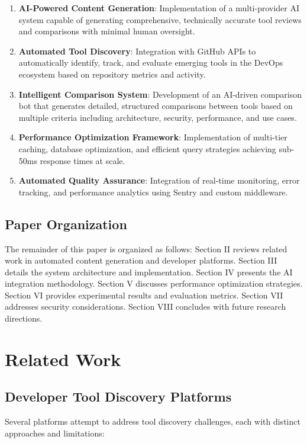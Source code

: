 \documentclass[conference]{IEEEtran}
\begin{document}
\begin{enumerate}
    \item \textbf{AI-Powered Content Generation}: Implementation of a multi-provider AI system capable of generating comprehensive, technically accurate tool reviews and comparisons with minimal human oversight.
    \item \textbf{Automated Tool Discovery}: Integration with GitHub APIs to automatically identify, track, and evaluate emerging tools in the DevOps ecosystem based on repository metrics and activity.
    \item \textbf{Intelligent Comparison System}: Development of an AI-driven comparison bot that generates detailed, structured comparisons between tools based on multiple criteria including architecture, security, performance, and use cases.
    \item \textbf{Performance Optimization Framework}: Implementation of multi-tier caching, database optimization, and efficient query strategies achieving sub-50ms response times at scale.
    \item \textbf{Automated Quality Assurance}: Integration of real-time monitoring, error tracking, and performance analytics using Sentry and custom middleware.
\end{enumerate}

\subsection{Paper Organization}

The remainder of this paper is organized as follows: Section II reviews related work in automated content generation and developer platforms. Section III details the system architecture and implementation. Section IV presents the AI integration methodology. Section V discusses performance optimization strategies. Section VI provides experimental results and evaluation metrics. Section VII addresses security considerations. Section VIII concludes with future research directions.

\section{Related Work}

\subsection{Developer Tool Discovery Platforms}

Several platforms attempt to address tool discovery challenges, each with distinct approaches and limitations:
\end{document}
